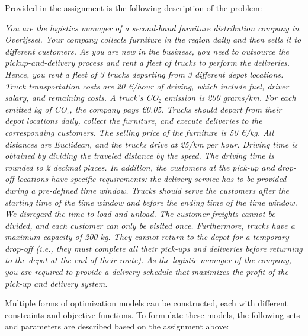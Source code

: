 Provided in the assignment is the following description of the problem:
\vspace{0.5cm}

\textit{You are the logistics manager of a second-hand furniture distribution company in Overijssel. Your company collects furniture in the region daily and then sells it to different customers. As you are new in the business, you need to outsource the pickup-and-delivery process and rent a fleet of trucks to perform the deliveries. Hence, you rent a fleet of 3 trucks departing from 3 different depot locations. Truck transportation costs are 20 €/hour of driving, which include fuel, driver salary, and remaining costs. A truck’s CO₂ emission is 200 grams/km. For each emitted kg of CO₂, the company pays €0.05. Trucks should depart from their depot locations daily, collect the furniture, and execute deliveries to the corresponding customers. The selling price of the furniture is 50 €/kg. All distances are Euclidean, and the trucks drive at 25/km per hour. Driving time is obtained by dividing the traveled distance by the speed. The driving time is rounded to 2 decimal places. In addition, the customers at the pick-up and drop-off locations have specific requirements: the delivery service has to be provided during a pre-defined time window. Trucks should serve the customers after the starting time of the time window and before the ending time of the time window. We disregard the time to load and unload. The customer freights cannot be divided, and each customer can only be visited once. Furthermore, trucks have a maximum capacity of 200 kg. They cannot return to the depot for a temporary drop-off (i.e., they must complete all their pick-ups and deliveries before returning to the depot at the end of their route). As the logistic manager of the company, you are required to provide a delivery schedule that maximizes the profit of the pick-up and delivery system.}
\vspace{0.5cm}

Multiple forms of optimization models can be constructed, each with different constraints and objective functions. To formulate these models, the following sets and parameters are described based on the assignment above:
\vspace{0.1cm}

